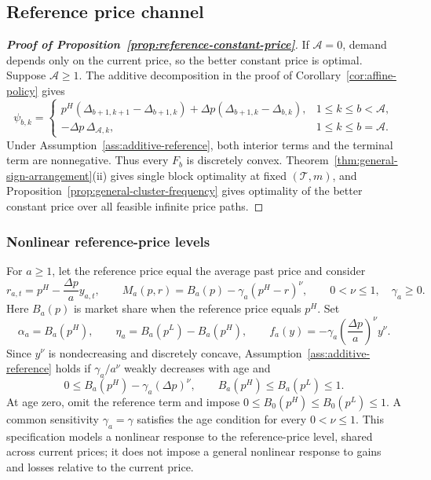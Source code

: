 \subsection{Reference price channel}
\label{app:reference-engagement}

\begingroup\color{black}
\begin{proof}[\normalfont\bfseries Proof of Proposition~\ref{prop:reference-constant-price}]
If \(\mathcal A=0\), demand depends only on the current price, so the better constant price is optimal. Suppose \(\mathcal A\ge1\). The additive decomposition in the proof of Corollary~\ref{cor:affine-policy} gives
\[
 \psi_{b,k}=\begin{cases}
 p^H(\Delta_{b+1,k+1}-\Delta_{b+1,k})
 +\Delta p(\Delta_{b+1,k}-\Delta_{b,k}),
     &1\le k\le b<\mathcal A,\\
 -\Delta p\,\Delta_{\mathcal A,k},
     &1\le k\le b=\mathcal A.
 \end{cases}
\]
Under Assumption~\ref{ass:additive-reference}, both interior terms and the terminal term are nonnegative. Thus every \(F_b\) is discretely convex. Theorem~\ref{thm:general-sign-arrangement}(ii) gives single block optimality at fixed \((\mathcal T,m)\), and Proposition~\ref{prop:general-cluster-frequency} gives optimality of the better constant price over all feasible infinite price paths.
\end{proof}

\subsubsection{Nonlinear reference-price levels}
For \(a\ge1\), let the reference price equal the average past price and consider
\[
 r_{a,t}=p^H-\frac{\Delta p}{a}y_{a,t},\qquad
 M_a(p,r)=B_a(p)-\gamma_a(p^H-r)^\nu,
 \qquad 0<\nu\le1,\quad\gamma_a\ge0.
\]
Here \(B_a(p)\) is market share when the reference price equals \(p^H\). Set
\[
 \alpha_a=B_a(p^H),\qquad
 \eta_a=B_a(p^L)-B_a(p^H),\qquad
 f_a(y)=-\gamma_a\left(\frac{\Delta p}{a}\right)^\nu y^\nu.
\]
Since \(y^\nu\) is nondecreasing and discretely concave, Assumption~\ref{ass:additive-reference} holds if \(\gamma_a/a^\nu\) weakly decreases with age and
\[
 0\le B_a(p^H)-\gamma_a(\Delta p)^\nu,\qquad
 B_a(p^H)\le B_a(p^L)\le1.
\]
At age zero, omit the reference term and impose \(0\le B_0(p^H)\le B_0(p^L)\le1\). A common sensitivity \(\gamma_a=\gamma\) satisfies the age condition for every \(0<\nu\le1\). This specification models a nonlinear response to the reference-price level, shared across current prices; it does not impose a general nonlinear response to gains and losses relative to the current price.

